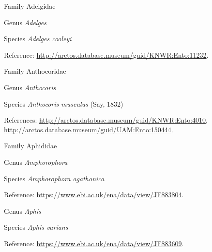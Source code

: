 \documentclass[9pt, article]{memoir}
\begin{document}
\begin{multicols}{2}
\vspace{6pt}\noindent\hspace{24pt}Family Adelgidae


\vspace{6pt}\noindent\hspace{30pt}Genus \textit{Adelges}


\vspace{6pt}\noindent\hspace{36pt}Species \textit{Adelges cooleyi}


\vspace{6pt}Reference: 
\url{http://arctos.database.museum/guid/KNWR:Ento:11232}.

\vspace{6pt}\noindent\hspace{24pt}Family Anthocoridae


\vspace{6pt}\noindent\hspace{30pt}Genus \textit{Anthocoris}


\vspace{6pt}\noindent\hspace{36pt}Species \textit{Anthocoris musculus} (Say, 1832)


\vspace{6pt}References: 
\url{http://arctos.database.museum/guid/KNWR:Ento:4010}, 
\url{http://arctos.database.museum/guid/UAM:Ento:150444}.

\vspace{6pt}\noindent\hspace{24pt}Family Aphididae


\vspace{6pt}\noindent\hspace{30pt}Genus \textit{Amphorophora}


\vspace{6pt}\noindent\hspace{36pt}Species \textit{Amphorophora agathonica}


\vspace{6pt}Reference: 
\url{https://www.ebi.ac.uk/ena/data/view/JF883804}.

\vspace{6pt}\noindent\hspace{30pt}Genus \textit{Aphis}


\vspace{6pt}\noindent\hspace{36pt}Species \textit{Aphis varians}


\vspace{6pt}Reference: 
\url{https://www.ebi.ac.uk/ena/data/view/JF883609}.


\end{multicols}
\end{document}

